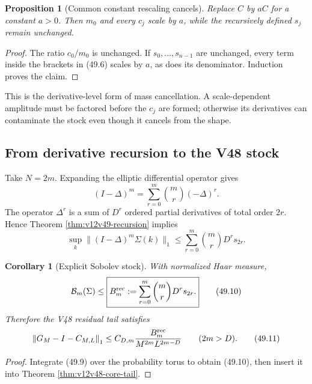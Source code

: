 \documentclass[11pt]{article}
\newtheorem{proposition}[theorem]{Proposition}
\newtheorem{corollary}[theorem]{Corollary}
\theoremstyle{remark}
\begin{document}
\begin{proposition}[Common constant rescaling cancels]
\label{prop:v12v49-scale}
Replace \(C\) by \(aC\) for a constant \(a>0\).  Then \(m_0\) and
every \(c_j\) scale by \(a\), while the recursively defined
\(s_j\) remain unchanged.
\end{proposition}

\begin{proof}
The ratio \(c_0/m_0\) is unchanged.  If
\(s_0,\ldots,s_{n-1}\) are unchanged, every term inside the brackets
in (49.6) scales by \(a\), as does its denominator.  Induction proves
the claim.
\end{proof}

This is the derivative-level form of mass cancellation.  A
scale-dependent amplitude must be factored before the \(c_j\) are
formed; otherwise its derivatives can contaminate the stock even
though it cancels from the shape.

\subsection{From derivative recursion to the V48 stock}

Take \(N=2m\).  Expanding the elliptic differential operator gives
\[
 (I-\Delta)^m
 =
 \sum_{r=0}^m\binom mr(-\Delta)^r.
\]
The operator \(\Delta^r\) is a sum of \(D^r\) ordered partial
derivatives of total order \(2r\).  Hence Theorem
\ref{thm:v12v49-recursion} implies
\begin{equation}
 \sup_k\|(I-\Delta)^m\Sigma(k)\|_1
 \leq
 \sum_{r=0}^m
 \binom mrD^rs_{2r}.                              \tag{49.9}
\end{equation}

\begin{corollary}[Explicit Sobolev stock]
\label{cor:v12v49-Sobolev-stock}
With normalized Haar measure,
\begin{equation}
 {\cal B}_m(\Sigma)
 \leq
 \boxed{
 B_m^{\rm rec}:=
 \sum_{r=0}^m\binom mrD^rs_{2r}.}                 \tag{49.10}
\end{equation}
Therefore the V48 residual tail satisfies
\begin{equation}
 \left\|G_M-I-C_{M,L}\right\|_1
 \leq
 C_{D,m}
 {B_m^{\rm rec}\over M^{2m}L^{2m-D}}
 \qquad(2m>D).                                   \tag{49.11}
\end{equation}
\end{corollary}

\begin{proof}
Integrate (49.9) over the probability torus to obtain (49.10), then
insert it into Theorem \ref{thm:v12v48-core-tail}.
\end{proof}
\end{document}
